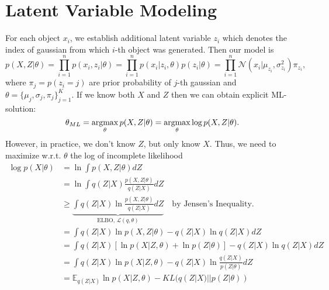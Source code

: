 \section{Latent Variable Modeling}

For each object $x_i$, we establish additional latent variable $z_i$ which denotes the index of gaussian from which $i$-th object was generated. Then our model is
$$p(X,Z|\theta) = \prod_{i=1}^{n}p(x_i,z_i|\theta) = \prod_{i=1}^{n}p(x_i|z_i,\theta)p(z_i|\theta) = \prod_{i=1}^{n}\mathcal{N}(x_i|\mu_{z_i},\sigma_{z_i}^2)\pi_{z_i},$$
where $\pi_{j} = p(z_i=j)$ are prior probability of $j$-th gaussian and $\theta = \{\mu_j, \sigma_j, \pi_j\}_{j=1}^K$. If we know both $X$ and $Z$ then we can obtain explicit ML-solution:
$$\theta_{ML} = \operatorname*{\operatorname{argmax}}_{\theta}p(X,Z|\theta) = \operatorname*{\operatorname{argmax}}_{\theta}\log p(X,Z|\theta).$$
However, in practice, we don't know $Z$, but only know $X$. Thus, we need to maximize w.r.t. $\theta$ the log of incomplete likelihood
\begin{align}
	\log p(X|\theta) & = \ln \int  p(X, Z|\theta)dZ\\
					 & = \ln\int q(Z|X) \frac{p(X, Z|\theta)}{q(Z|X)}dZ\\
					 & \geq \underbrace{\int q(Z|X) \ln\frac{p(X, Z|\theta)}{q(Z|X)}dZ}_{\textrm{ELBO, } \mathcal{L}(q,\theta)} \quad\textrm{by Jensen's Inequality.}\\
					 &= \int q(Z|X) \ln p(X, Z|\theta) - q(Z|X)\ln q(Z|X)dZ\\
					 &= \int q(Z|X)[\ln p(X|Z,\theta) + \ln p(Z|\theta)]  - q(Z|X)\ln q(Z|X)dZ\\
					 &= \int q(Z|X)\ln p(X|Z,\theta)  - q(Z|X)\ln\frac{q(Z|X)}{p(Z|\theta)}dZ\\
					 &= \mathbb{E}_{q(Z|X)} \ln p(X|Z,\theta)  - KL(q(Z|X)||p(Z|\theta)) 
	\label{eq:elbo}
\end{align}

